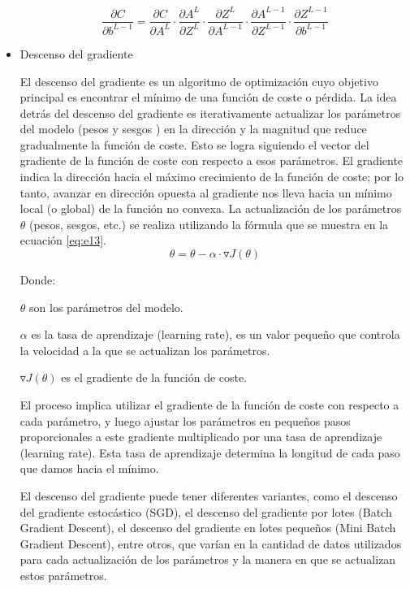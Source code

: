 \begin{itemize}
\begin{equation} \label{eq:e12} 
	\frac{\partial C}{\partial b^{L-1}}=\frac{\partial C}{\partial A^L}\cdot \frac{\partial A^L }{\partial Z^L}\cdot \frac{\partial Z^L }{\partial A^{L-1}}\cdot \frac{\partial A^{L-1} }{\partial Z^{L-1}}\cdot \frac{\partial Z^{L-1}}{\partial b^{L-1}}
\end{equation}


	\item Descenso del gradiente
	
El descenso del gradiente es un algoritmo de optimización cuyo objetivo principal es encontrar el mínimo de una función de coste o pérdida. La idea detrás del descenso del gradiente es iterativamente actualizar los parámetros del modelo (pesos y sesgos ) en la dirección y la magnitud que reduce gradualmente la función de coste. Esto se logra siguiendo el vector del gradiente de la función de coste con respecto a esos parámetros. El gradiente indica la dirección hacia el máximo crecimiento de la función de coste; por lo tanto, avanzar en dirección opuesta al gradiente nos lleva hacia un mínimo local (o global) de la función no convexa. La actualización de los parámetros $\theta$ (pesos, sesgos, etc.) se realiza utilizando la fórmula que se muestra en la ecuación \ref{eq:e13}.
\begin{equation} \label{eq:e13} 
	\theta = \theta - \alpha \cdot\triangledown J(\theta)
\end{equation}


Donde:

$\theta$ son los parámetros del modelo.

$\alpha$  es la tasa de aprendizaje (learning rate), es un valor pequeño que controla la velocidad a la que se actualizan los parámetros.

$\triangledown J(\theta)$  es el gradiente de la función de coste.

El proceso implica utilizar el gradiente de la función de coste con respecto a cada parámetro, y luego ajustar los parámetros en pequeños pasos proporcionales a este gradiente multiplicado por una tasa de aprendizaje (learning rate). Esta tasa de aprendizaje determina la longitud de cada paso que damos hacia el mínimo.

El descenso del gradiente puede tener diferentes variantes, como el descenso del gradiente estocástico (SGD), el descenso del gradiente por lotes (Batch Gradient Descent), el descenso del gradiente en lotes pequeños (Mini Batch Gradient Descent), entre otros, que varían en la cantidad de datos utilizados para cada actualización de los parámetros y la manera en que se actualizan estos parámetros.

\end{itemize}
